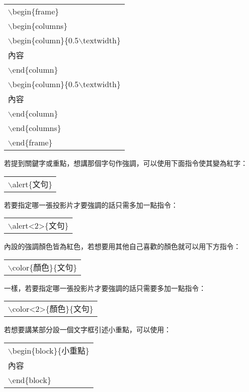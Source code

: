 \begin{center}\colorbox{slight}{\begin{tabular}{p{}}
    $\backslash$begin\{frame\}\\
    $\backslash$begin\{columns\}\\
    $\backslash$begin\{column\}\{0.5$\backslash$textwidth\}\\
    內容\\
    $\backslash$end\{column\}\\
    $\backslash$begin\{column\}\{0.5$\backslash$textwidth\}\\
    內容\\
    $\backslash$end\{column\}\\
    $\backslash$end\{columns\}\\
    $\backslash$end\{frame\}\\
\end{tabular}}
\end{center}
若提到關鍵字或重點，想講那個字句作強調，可以使用下面指令使其變為紅字：
\begin{center}\colorbox{slight}{\begin{tabular}{p{}}
	{$\backslash$alert\{文句\}}
\end{tabular}}
\end{center}
若要指定哪一張投影片才要強調的話只需多加一點指令：
\begin{center}\colorbox{slight}{\begin{tabular}{p{}}
	{$\backslash$alert<2>\{文句\}}
\end{tabular}}
\end{center}
內設的強調顏色皆為紅色，若想要用其他自己喜歡的顏色就可以用下方指令：
\begin{center}\colorbox{slight}{\begin{tabular}{p{}}
	{$\backslash$color\{顏色\}\{文句\}}
\end{tabular}}
\end{center}
一樣，若要指定哪一張投影片才要強調的話只需要多加一點指令：
\begin{center}\colorbox{slight}{\begin{tabular}{p{}}
	{$\backslash$color<2>\{顏色\}\{文句\}}
\end{tabular}}
\end{center}
若想要講某部分設一個文字框引述小重點，可以使用：
\begin{center}\colorbox{slight}{\begin{tabular}{p{}}
	$\backslash$begin\{block\}\{小重點\}\\
	內容\\
	$\backslash$end\{block\}\\
\end{tabular}}
\end{center}
